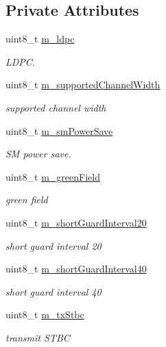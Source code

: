 \subsection*{Private Attributes}
\begin{DoxyCompactItemize}
\item 
uint8\+\_\+t \hyperlink{classns3_1_1HtCapabilities_abcac69318c2aaef8359d24417f1528bd}{m\+\_\+ldpc}
\begin{DoxyCompactList}\small\item\em L\+D\+PC. \end{DoxyCompactList}\item 
uint8\+\_\+t \hyperlink{classns3_1_1HtCapabilities_ad16923ce5393308e4aed4df710608925}{m\+\_\+supported\+Channel\+Width}
\begin{DoxyCompactList}\small\item\em supported channel width \end{DoxyCompactList}\item 
uint8\+\_\+t \hyperlink{classns3_1_1HtCapabilities_affda9514f4896c315174a659b00aed6a}{m\+\_\+sm\+Power\+Save}
\begin{DoxyCompactList}\small\item\em SM power save. \end{DoxyCompactList}\item 
uint8\+\_\+t \hyperlink{classns3_1_1HtCapabilities_ae36eca280f5e24b104a0ca1ba9d911bb}{m\+\_\+green\+Field}
\begin{DoxyCompactList}\small\item\em green field \end{DoxyCompactList}\item 
uint8\+\_\+t \hyperlink{classns3_1_1HtCapabilities_a0b88558f1d05ee4d787a57469ffcf91c}{m\+\_\+short\+Guard\+Interval20}
\begin{DoxyCompactList}\small\item\em short guard interval 20 \end{DoxyCompactList}\item 
uint8\+\_\+t \hyperlink{classns3_1_1HtCapabilities_a083eba0f7135149f8aeb1b1c728395fb}{m\+\_\+short\+Guard\+Interval40}
\begin{DoxyCompactList}\small\item\em short guard interval 40 \end{DoxyCompactList}\item 
uint8\+\_\+t \hyperlink{classns3_1_1HtCapabilities_ac17341a9c1ea2d18e6d056d3be310d96}{m\+\_\+tx\+Stbc}
\begin{DoxyCompactList}\small\item\em transmit S\+T\+BC \end{DoxyCompactList}\item 

\end{DoxyCompactItemize}
